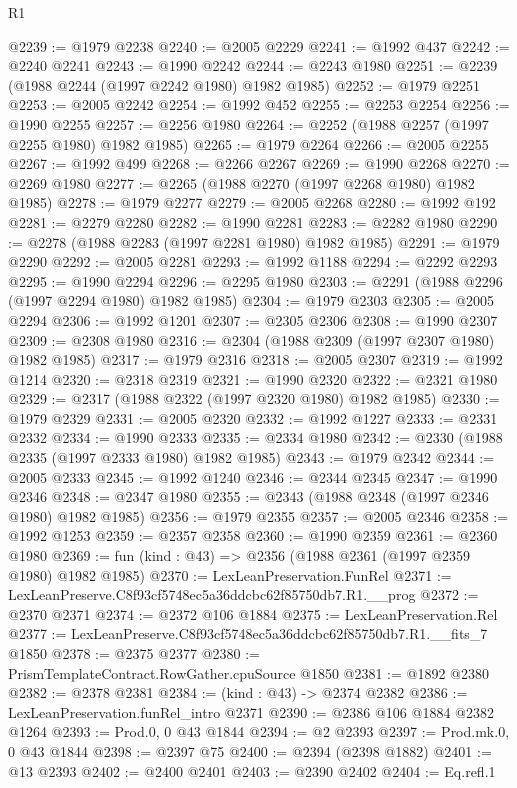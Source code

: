 \begin{lexlean}{R1}
\begin{coremodule}
@2239 := @1979 @2238
@2240 := @2005 @2229
@2241 := @1992 @437
@2242 := @2240 @2241
@2243 := @1990 @2242
@2244 := @2243 @1980
@2251 := @2239 (@1988 @2244 (@1997 @2242 @1980) @1982 @1985)
@2252 := @1979 @2251
@2253 := @2005 @2242
@2254 := @1992 @452
@2255 := @2253 @2254
@2256 := @1990 @2255
@2257 := @2256 @1980
@2264 := @2252 (@1988 @2257 (@1997 @2255 @1980) @1982 @1985)
@2265 := @1979 @2264
@2266 := @2005 @2255
@2267 := @1992 @499
@2268 := @2266 @2267
@2269 := @1990 @2268
@2270 := @2269 @1980
@2277 := @2265 (@1988 @2270 (@1997 @2268 @1980) @1982 @1985)
@2278 := @1979 @2277
@2279 := @2005 @2268
@2280 := @1992 @192
@2281 := @2279 @2280
@2282 := @1990 @2281
@2283 := @2282 @1980
@2290 := @2278 (@1988 @2283 (@1997 @2281 @1980) @1982 @1985)
@2291 := @1979 @2290
@2292 := @2005 @2281
@2293 := @1992 @1188
@2294 := @2292 @2293
@2295 := @1990 @2294
@2296 := @2295 @1980
@2303 := @2291 (@1988 @2296 (@1997 @2294 @1980) @1982 @1985)
@2304 := @1979 @2303
@2305 := @2005 @2294
@2306 := @1992 @1201
@2307 := @2305 @2306
@2308 := @1990 @2307
@2309 := @2308 @1980
@2316 := @2304 (@1988 @2309 (@1997 @2307 @1980) @1982 @1985)
@2317 := @1979 @2316
@2318 := @2005 @2307
@2319 := @1992 @1214
@2320 := @2318 @2319
@2321 := @1990 @2320
@2322 := @2321 @1980
@2329 := @2317 (@1988 @2322 (@1997 @2320 @1980) @1982 @1985)
@2330 := @1979 @2329
@2331 := @2005 @2320
@2332 := @1992 @1227
@2333 := @2331 @2332
@2334 := @1990 @2333
@2335 := @2334 @1980
@2342 := @2330 (@1988 @2335 (@1997 @2333 @1980) @1982 @1985)
@2343 := @1979 @2342
@2344 := @2005 @2333
@2345 := @1992 @1240
@2346 := @2344 @2345
@2347 := @1990 @2346
@2348 := @2347 @1980
@2355 := @2343 (@1988 @2348 (@1997 @2346 @1980) @1982 @1985)
@2356 := @1979 @2355
@2357 := @2005 @2346
@2358 := @1992 @1253
@2359 := @2357 @2358
@2360 := @1990 @2359
@2361 := @2360 @1980
@2369 := fun (kind : @43) => @2356 (@1988 @2361 (@1997 @2359 @1980) @1982 @1985)
@2370 := LexLeanPreservation.FunRel
@2371 := LexLeanPreserve.C8f93cf5748ec5a36ddcbc62f85750db7.R1.__prog
@2372 := @2370 @2371
@2374 := @2372 @106 @1884
@2375 := LexLeanPreservation.Rel
@2377 := LexLeanPreserve.C8f93cf5748ec5a36ddcbc62f85750db7.R1.__fits_7 @1850
@2378 := @2375 @2377
@2380 := PrismTemplateContract.RowGather.cpuSource @1850
@2381 := @1892 @2380
@2382 := @2378 @2381
@2384 := (kind : @43) -> @2374 @2382
@2386 := LexLeanPreservation.funRel_intro @2371
@2390 := @2386 @106 @1884 @2382 @1264
@2393 := Prod.{0, 0} @43 @1844
@2394 := @2 @2393
@2397 := Prod.mk.{0, 0} @43 @1844
@2398 := @2397 @75
@2400 := @2394 (@2398 @1882)
@2401 := @13 @2393
@2402 := @2400 @2401
@2403 := @2390 @2402
@2404 := Eq.refl.{1}

\end{coremodule}
\end{lexlean}
